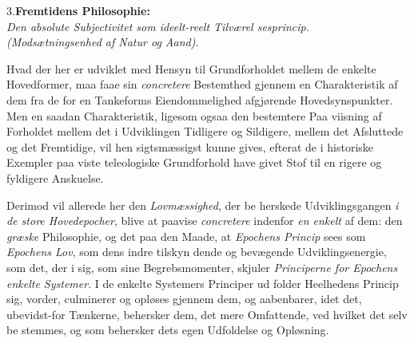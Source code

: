 \begin{center}
%
3.\enspace\textbf{Fremtidens Philosophie:}\\[2pt]
\emph{Den absolute Subjectivitet som ideelt-reelt Tilværel\-%
sesprincip.}\\
\emph{(Modsætningsenhed af Natur og Aand).}
\end{center}
\divrule

Hvad der her er udviklet med Hensyn til Grundforholdet
mellem de enkelte Hovedformer, maa faae sin \emph{concretere}
Bestemthed gjennem en Charakteristik af dem fra de for en
Tankeforms Eiendommelighed afgjørende Hovedsynspunkter. Men
en saadan Charakteristik, ligesom ogsaa den bestemtere Paa\-%
viisning af Forholdet mellem det i Udviklingen Tidligere og
Sildigere, mellem det Afsluttede og det Fremtidige, vil hen\-%
sigtsmæssigst kunne gives, efterat de i historiske Exempler paa\-%
viste teleologiske Grundforhold have givet Stof til en rigere og
fyldigere Anskuelse.

Derimod vil allerede her den \emph{Lovmæssighed}, der be\-%
herskede Udviklingsgangen \emph{i de store Hovedepocher}, blive
at paavise \emph{concretere} indenfor \emph{en enkelt} af dem: den
\emph{græske} Philosophie, og det paa den Maade, at \emph{Epochens
Princip} sees som \emph{Epochens Lov}, som dens indre tilskyn\-%
dende og bevægende Udviklingsenergie, som det, der i sig, som
sine Begrebsmomenter, skjuler \emph{Principerne for Epochens
enkelte Systemer}. I de enkelte Systemers Principer ud\-%
folder Heelhedens Princip sig, vorder, culminerer og opløses
gjennem dem, og aabenbarer, idet det, ubevidst-for Tænkerne,
behersker dem, det mere Omfattende, ved hvilket det selv be\-%
stemmes, og som behersker dets egen Udfoldelse og Opløsning.

